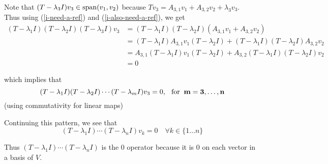 \begin{prf}
  Note that $(T-\lambda_3 I) v_3 \in \operatorname{span} (v_1, v_2)$ because $T v_3 = A_{3,1} v_1 +   A_{3,2} v_2 + \lambda_3 v_3$. \\
  Thus using (\ref{i-need-a-ref}) and (\ref{i-also-need-a-ref}), we get
  \begin{equation}
    \begin{aligned}
    (T- \lambda_1 I) (T- \lambda_2 I) (T- \lambda_3 I)v_3 
    &=(T- \lambda_1 I) (T- \lambda_2 I)(A_{3,1} v_1 +   A_{3,2} v_2)  \\
    &= (T- \lambda_1 I)A_{3,1} v_1(T- \lambda_2 I)+(T- \lambda_1 I)(T- \lambda_2 I)A_{3,2} v_2 \\
    &= A_{3,1}(T- \lambda_1 I) v_1(T- \lambda_2 I)+A_{3,2}(T- \lambda_1 I)(T- \lambda_2 I) v_2 \\
    &= 0
    \end{aligned}
  \end{equation}
  
  which implies that
  \begin{equation}
    (T-\lambda_1 I) (T-\lambda_2 I) \cdots (T-\lambda_m I) v_3= 0, \;\;\, \text{for}\;\; \mathbf{m = 3, \ldots, n}
  \end{equation}
  (using commutativity for linear maps)
  \bigbreak
  
  Continuing this pattern, we see that
  \begin{equation}
    (T-\lambda_1 I) \cdots (T- \lambda_n I) v_k = 0 \quad \forall k \in \{ 1\ldots n \}
  \end{equation}
  
  Thus $(T-\lambda_1 I) \cdots (T- \lambda_n I)$ is the $0$ operator because it is $0$ on each vector in a basis of $V$.
\end{prf}

